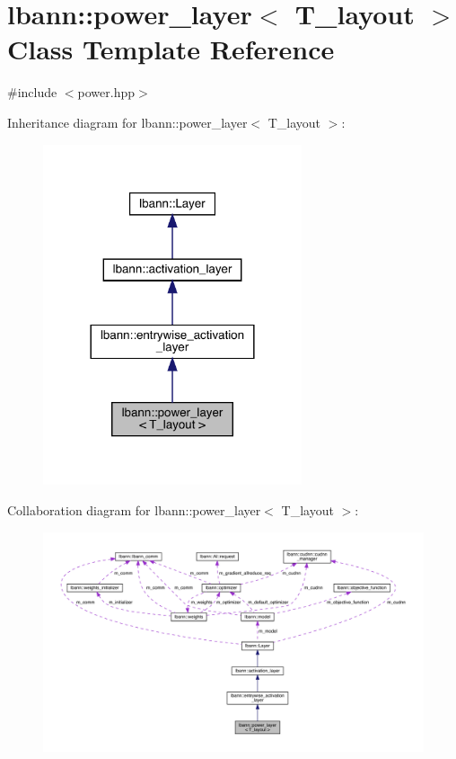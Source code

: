 \hypertarget{classlbann_1_1power__layer}{}\section{lbann\+:\+:power\+\_\+layer$<$ T\+\_\+layout $>$ Class Template Reference}
\label{classlbann_1_1power__layer}


{\ttfamily \#include $<$power.\+hpp$>$}



Inheritance diagram for lbann\+:\+:power\+\_\+layer$<$ T\+\_\+layout $>$\+:\nopagebreak
\begin{figure}[H]
\begin{center}
\leavevmode
\includegraphics[width=216pt]{classlbann_1_1power__layer__inherit__graph}
\end{center}
\end{figure}


Collaboration diagram for lbann\+:\+:power\+\_\+layer$<$ T\+\_\+layout $>$\+:\nopagebreak
\begin{figure}[H]
\begin{center}
\leavevmode
\includegraphics[width=350pt]{classlbann_1_1power__layer__coll__graph}
\end{center}
\end{figure}
